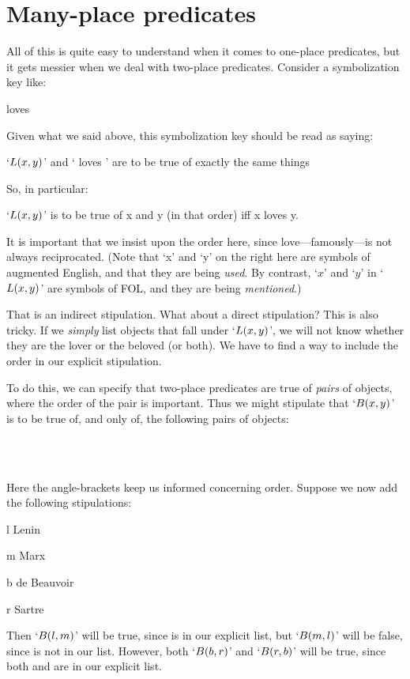 \section{Many-place predicates}
All of this is quite easy to understand when it comes to one-place predicates, but it gets messier when we deal with two-place predicates. Consider a symbolization key like:
	\begin{ekey}
		\item[\atom{L}{x,y}]  loves 
	\end{ekey}
Given what we said above, this symbolization key should be read as saying:
	\begin{earg}
		\item[\textbullet] `$\mathord{L}(x,y)$' and ` loves ' are to be true of exactly the same things
	\end{earg}
So, in particular:
	\begin{earg}
		\item[\textbullet] `$\mathord{L}(x,y)$' is to be true of x and y (in that order) iff x loves y. 
	\end{earg}
It is important that we insist upon the order here, since love---famously---is not always reciprocated. (Note that `x' and `y' on the right here are symbols of augmented English, and that they are being \emph{used}. By contrast, `$x$' and `$y$' in `$\mathord{L}(x,y)$' are symbols of FOL, and they are being \emph{mentioned}.)

That is an indirect stipulation. What about a direct stipulation? This is also tricky. If we \emph{simply} list objects that fall under `$\mathord{L}(x,y)$', we will not know whether they are the lover or the beloved (or both). We have to find a way to include the order in our explicit stipulation. 

To do this, we can specify that two-place predicates are true of \emph{pairs} of objects, where the order of the pair is important. Thus we might stipulate that `$\mathord{B}(x,y)$' is to be true of, and only of, the following pairs of objects:
	\begin{center}
		\ntuple{Lenin, Marx}\\
		\ntuple{de Beauvoir, Sartre}\\
		\ntuple{Sartre, de Beauvoir}
	\end{center}
Here the angle-brackets keep us informed concerning order. Suppose we now add the following stipulations:
	\begin{ekey}
		\item[l] Lenin
		\item[m] Marx
		\item[b] de Beauvoir
		\item[r] Sartre
	\end{ekey}
Then `$\mathord{B}(l,m)$' will be true, since  is in our explicit list, but `$\mathord{B}(m,l)$' will be false, since  is not in our list. However, both `$\mathord{B}(b,r)$' and `$\mathord{B}(r,b)$' will be true, since both  and  are in our explicit list.

